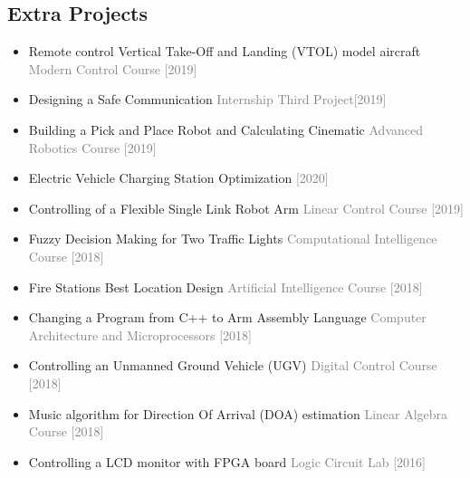 \documentclass[10pt,a4paper,sans]{moderncv} %
\begin{document}
            \subsection{Extra Projects}
            \begin{itemize}
            \item Remote control Vertical Take-Off and Landing (VTOL) model aircraft \hfill \textcolor{gray}{Modern Control Course [2019]}
            \item Designing a Safe Communication \hfill \textcolor{gray}{Internship Third Project[2019]}	
            \item Building a Pick and Place Robot and Calculating Cinematic \hfill \textcolor{gray}{Advanced Robotics Course [2019]}	
            \item Electric Vehicle Charging Station Optimization \hfill \textcolor{gray}{ [2020]}

            \item Controlling of a Flexible Single Link Robot Arm \hfill \textcolor{gray}{Linear Control Course [2019]}
            
            \item Fuzzy Decision Making for Two Traffic Lights \hfill \textcolor{gray}{Computational Intelligence Course [2018]}
            
            \item Fire Stations Best Location Design \hfill \textcolor{gray}{Artificial Intelligence Course [2018]}	
            
            \item Changing a Program from C++ to Arm Assembly Language \hfill \textcolor{gray}{Computer Architecture and Microprocessors [2018]}
            
            \item Controlling an Unmanned Ground Vehicle (UGV) \hfill \textcolor{gray}{Digital Control Course [2018]}
            
            \item Music algorithm for Direction Of Arrival (DOA) estimation  \hfill \textcolor{gray}{Linear Algebra Course [2018]}
            
            \item Controlling a LCD monitor with FPGA board \hfill \textcolor{gray}{Logic Circuit Lab [2016]}
        \end{itemize}
	
	\vspace{-0.5 em}
\end{document}
